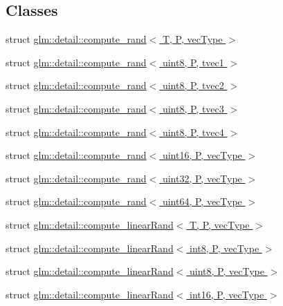 \subsection*{Classes}
\begin{DoxyCompactItemize}
\item 
struct \hyperlink{structglm_1_1detail_1_1compute__rand}{glm\+::detail\+::compute\+\_\+rand$<$ T, P, vec\+Type $>$}
\item 
struct \hyperlink{structglm_1_1detail_1_1compute__rand_3_01uint8_00_01_p_00_01tvec1_01_4}{glm\+::detail\+::compute\+\_\+rand$<$ uint8, P, tvec1 $>$}
\item 
struct \hyperlink{structglm_1_1detail_1_1compute__rand_3_01uint8_00_01_p_00_01tvec2_01_4}{glm\+::detail\+::compute\+\_\+rand$<$ uint8, P, tvec2 $>$}
\item 
struct \hyperlink{structglm_1_1detail_1_1compute__rand_3_01uint8_00_01_p_00_01tvec3_01_4}{glm\+::detail\+::compute\+\_\+rand$<$ uint8, P, tvec3 $>$}
\item 
struct \hyperlink{structglm_1_1detail_1_1compute__rand_3_01uint8_00_01_p_00_01tvec4_01_4}{glm\+::detail\+::compute\+\_\+rand$<$ uint8, P, tvec4 $>$}
\item 
struct \hyperlink{structglm_1_1detail_1_1compute__rand_3_01uint16_00_01_p_00_01vec_type_01_4}{glm\+::detail\+::compute\+\_\+rand$<$ uint16, P, vec\+Type $>$}
\item 
struct \hyperlink{structglm_1_1detail_1_1compute__rand_3_01uint32_00_01_p_00_01vec_type_01_4}{glm\+::detail\+::compute\+\_\+rand$<$ uint32, P, vec\+Type $>$}
\item 
struct \hyperlink{structglm_1_1detail_1_1compute__rand_3_01uint64_00_01_p_00_01vec_type_01_4}{glm\+::detail\+::compute\+\_\+rand$<$ uint64, P, vec\+Type $>$}
\item 
struct \hyperlink{structglm_1_1detail_1_1compute__linear_rand}{glm\+::detail\+::compute\+\_\+linear\+Rand$<$ T, P, vec\+Type $>$}
\item 
struct \hyperlink{structglm_1_1detail_1_1compute__linear_rand_3_01int8_00_01_p_00_01vec_type_01_4}{glm\+::detail\+::compute\+\_\+linear\+Rand$<$ int8, P, vec\+Type $>$}
\item 
struct \hyperlink{structglm_1_1detail_1_1compute__linear_rand_3_01uint8_00_01_p_00_01vec_type_01_4}{glm\+::detail\+::compute\+\_\+linear\+Rand$<$ uint8, P, vec\+Type $>$}
\item 
struct \hyperlink{structglm_1_1detail_1_1compute__linear_rand_3_01int16_00_01_p_00_01vec_type_01_4}{glm\+::detail\+::compute\+\_\+linear\+Rand$<$ int16, P, vec\+Type $>$}

\end{DoxyCompactItemize}
